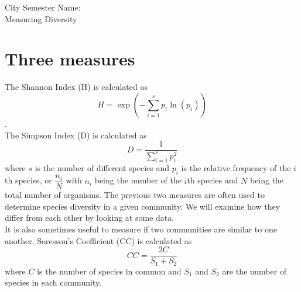 \documentclass[12pt]{article}
\theoremstyle{plain}     %
\begin{document}
\large
City Semester  \hspace{8cm} Name:\makebox[6cm]{\hrulefill}
\\
Measuring Diversity\\
\normalsize 
\section*{Three measures}
The 	Shannon Index (H) is calculated as $$H=\exp\left(-\sum\limits_{i=1} ^s p_i \ln(p_i)\right)$$.\\
The Simpson Index (D) is calculated as $$D=\frac{1}{\sum\limits_{i=1}^s p_i^2}$$
where $s$ is the number of different species and $p_i$ is the relative frequency of the $i$th species, or $\dfrac{n_i}{N}$ with $n_i$ being the number of the $i$th species and $N$ being the total number of organisms.
The previous two measures are often used to determine species diversity in a given community. We will examine how they differ from each other by looking at some data.\\[.5cm]
It is also sometimes useful to measure if two communities are similar to one another. 
Soresson's Coefficient (CC) is calculated as $$CC=\frac{2C}{S_1 + S_2}$$
where $C$ is the number of species in common and $S_1$ and $S_2$ are the number of species in each community.
\end{document}
